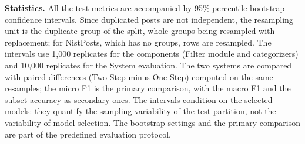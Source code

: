 \textbf{Statistics.} All the test metrics are accompanied by 95{\%} percentile bootstrap confidence intervals. Since duplicated posts are not independent, the resampling unit is the duplicate group of the split, whole groups being resampled with replacement; for NistPosts, which has no groups, rows are resampled. The intervals use 1,000 replicates for the components (Filter module and categorizers) and 10,000 replicates for the System evaluation. The two systems are compared with paired differences (Two-Step minus One-Step) computed on the same resamples; the micro F1 is the primary comparison, with the macro F1 and the subset accuracy as secondary ones. The intervals condition on the selected models: they quantify the sampling variability of the test partition, not the variability of model selection. The bootstrap settings and the primary comparison are part of the predefined evaluation protocol.

